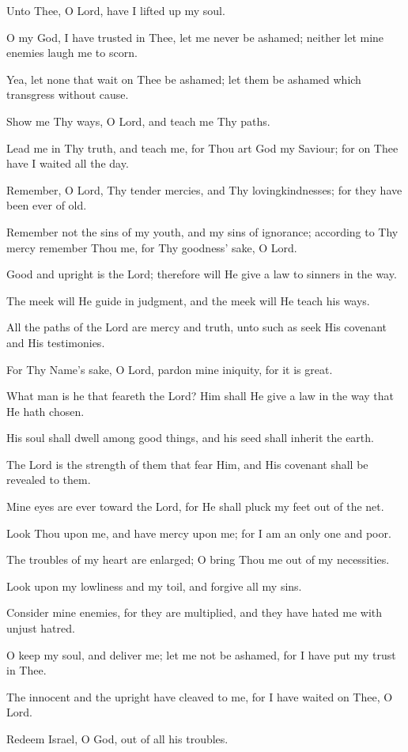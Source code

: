 Unto Thee, O Lord, have I lifted up my soul.

O my God, I have trusted in Thee, let me never be ashamed; neither let mine enemies laugh me to scorn.

Yea, let none that wait on Thee be ashamed; let them be ashamed which transgress without cause.

Show me Thy ways, O Lord, and teach me Thy paths.

Lead me in Thy truth, and teach me, for Thou art God my Saviour; for on Thee have I waited all the day.

Remember, O Lord, Thy tender mercies, and Thy lovingkindnesses; for they have been ever of old.

Remember not the sins of my youth, and my sins of ignorance; according to Thy mercy remember Thou me, for Thy goodness’ sake, O Lord.

Good and upright is the Lord; therefore will He give a law to
sinners in the way.

The meek will He guide in judgment, and the meek will He teach his ways.

All the paths of the Lord are mercy and truth, unto such as seek His covenant and His testimonies.

For Thy Name's sake, O Lord, pardon mine iniquity, for it is great.

What man is he that feareth the Lord? Him shall He give a law in the way that He hath chosen.

His soul shall dwell among good things, and his seed shall inherit the earth.

The Lord is the strength of them that fear Him, and His covenant shall be revealed to them.

Mine eyes are ever toward the Lord, for He shall pluck my feet out of the net.

Look Thou upon me, and have mercy upon me; for I am an only one and poor.

The troubles of my heart are enlarged; O bring Thou me out of my necessities.

Look upon my lowliness and my toil, and forgive all my sins.

Consider mine enemies, for they are multiplied, and they have hated me with unjust hatred.

O keep my soul, and deliver me; let me not be ashamed, for I have put my trust in Thee.

The innocent and the upright have cleaved to me, for I have waited on Thee, O Lord.

Redeem Israel, O God, out of all his troubles.
